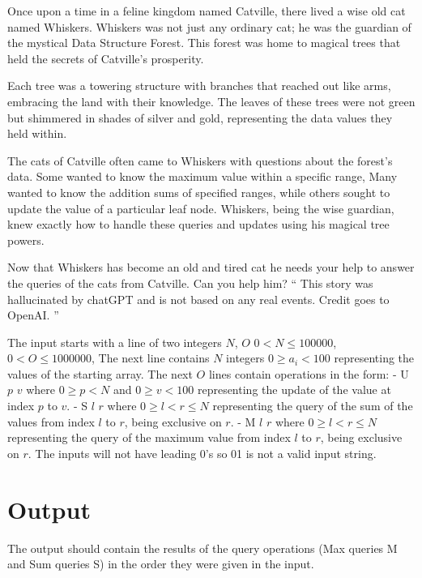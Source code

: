 Once upon a time in a feline kingdom named Catville, there lived a wise old cat named Whiskers. Whiskers was not just any ordinary cat; he was the guardian of the mystical Data Structure Forest. This forest was home to magical trees that held the secrets of Catville's prosperity.

Each tree was a towering structure with branches that reached out like arms, embracing the land with their knowledge. The leaves of these trees were not green but shimmered in shades of silver and gold, representing the data values they held within.

The cats of Catville often came to Whiskers with questions about the forest's data. Some wanted to know the maximum value within a specific range, Many wanted to know the addition sums of specified ranges, while others sought to update the value of a particular leaf node. Whiskers, being the wise guardian, knew exactly how to handle these queries and updates using his magical tree powers.

Now that Whiskers has become an old and tired cat he needs your help to answer the queries of the cats from Catville. Can you help him?
`` This story was hallucinated by chatGPT and is not based on any real events. Credit goes to OpenAI. '' 

{\setlength{\parindent}{0cm}
}
\begin{Input}
The input starts with a line of two integers $N$, $O$
{\setlength{\parindent}{0cm}
$0 < N \leq 100 000$,
$0 < O \leq 1 000 000$, 
The next line contains $N$ integers $0 \geq a_i < 100$ representing the values of the starting array.  
The next $O$ lines contain operations in the form:
    - U $p$ $v$ where $0 \geq p < N$ and $0 \geq v < 100$ representing the update of the value at index $p$ to $v$.
    - S $l$ $r$ where $0 \geq l < r \leq N$ representing the query of the sum of the values from index $l$ to $r$, being exclusive on $r$.
    - M $l$ $r$ where $0 \geq l < r \leq N$ representing the query of the maximum value from index $l$ to $r$, being exclusive on $r$.
}
{\setlength{\parindent}{0cm}
The inputs will not have leading 0's so 01 is not a valid input string.
}
\end{Input}

\section*{Output}
The output should contain the results of the query operations (Max queries M and Sum queries S) in the order they were given in the input. 
{\setlength{\parindent}{0cm}
}

